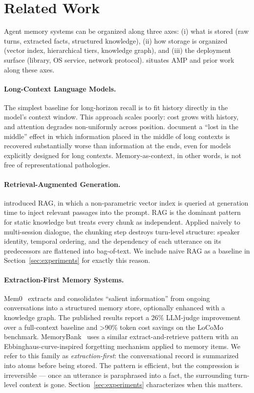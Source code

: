 \section{Related Work}
\label{sec:related}

Agent memory systems can be organized along three axes: (i) what is stored (raw turns, extracted facts, structured knowledge), (ii) how storage is organized (vector index, hierarchical tiers, knowledge graph), and (iii) the deployment surface (library, OS service, network protocol).  situates AMP and prior work along these axes.

\paragraph{Long-Context Language Models.} The simplest baseline for long-horizon recall is to fit history directly in the model's context window. This approach scales poorly: cost grows with history, and attention degrades non-uniformly across position. \citet{liu2024lost} document a ``lost in the middle'' effect in which information placed in the middle of long contexts is recovered substantially worse than information at the ends, even for models explicitly designed for long contexts. Memory-as-context, in other words, is not free of representational pathologies.

\paragraph{Retrieval-Augmented Generation.} \citet{lewis2020rag} introduced RAG, in which a non-parametric vector index is queried at generation time to inject relevant passages into the prompt. RAG is the dominant pattern for static knowledge but treats every chunk as independent. Applied naively to multi-session dialogue, the chunking step destroys turn-level structure: speaker identity, temporal ordering, and the dependency of each utterance on its predecessors are flattened into bag-of-text. We include naive RAG as a baseline in Section~\ref{sec:experiments} for exactly this reason.

\paragraph{Extraction-First Memory Systems.} Mem0~\citep{mem0} extracts and consolidates ``salient information'' from ongoing conversations into a structured memory store, optionally enhanced with a knowledge graph. The published results report a 26\% LLM-judge improvement over a full-context baseline and >90\% token cost savings on the LoCoMo benchmark. MemoryBank~\citep{memorybank} uses a similar extract-and-retrieve pattern with an Ebbinghaus-curve-inspired forgetting mechanism applied to memory items. We refer to this family as \emph{extraction-first}: the conversational record is summarized into atoms before being stored. The pattern is efficient, but the compression is irreversible --- once an utterance is paraphrased into a fact, the surrounding turn-level context is gone. Section~\ref{sec:experiments} characterizes when this matters.

